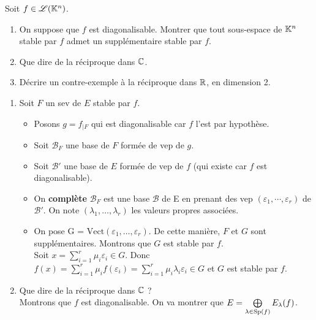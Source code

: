 \begin{exercice}
    Soit $f \in \mathscr{L}(\mathbb{K}^n)$.
    \begin{enumerate}
        \item On suppose que $f$ est diagonalisable. Montrer que tout sous-espace de $\mathbb{K}^n$ stable par $f$ admet un supplémentaire stable par $f$.
        \item Que dire de la réciproque dans $\mathbb{C}$.
        \item Décrire un contre-exemple à la réciproque dans $\mathbb{R}$, en dimension 2.
    \end{enumerate}
\end{exercice}  

\begin{enumerate}
    \item Soit $F$ un sev de $E$ stable par $f$.
    \begin{itemize}
        \item Posons $g = f_{\vert F}$ qui est diagonalisable car $f$ l'est par hypothèse. 
        \item Soit $\mathscr{B}_F$ une base de $F$ formée de vep de $g$. 
        \item Soit $\mathscr{B}'$ une base de $E$ formée de vep de $f$ (qui existe car $f$ est diagonalisable).
        \item On \textbf{complète} $\mathscr{B}_F$ est une base $\mathscr{B}$ de E en prenant des vep $(\varepsilon_1, \cdots, \varepsilon_r)$ de $\mathscr{B}'$. On note $(\lambda_1, \dots, \lambda_r)$ les valeurs propres associées. 
        \item On pose G = $\mathrm{Vect}(\varepsilon_1, \dots, \varepsilon_r)$. De cette manière, $F$ et $G$ sont supplémentaires. Montrons que $G$ est stable par $f$. \\
        Soit $x = \sum\limits_{i=1}^{r} \mu_i \varepsilon_i \in G$. Donc $f(x) = \sum\limits_{i=1}^{r} \mu_i f(\varepsilon_i) =  \sum\limits_{i=1}^{r} \mu_i \lambda_i \varepsilon_i \in G$ et $G$ est stable par $f$.
    \end{itemize}
    
    \item Que dire de la réciproque dans $\mathbb{C}$ ? \\
    Montrons que $f$ est diagonalisable. On va montrer que $E = \bigoplus\limits_{\lambda \in \mathrm{Sp}(f)} E_\lambda (f)$.
    

\end{enumerate}
